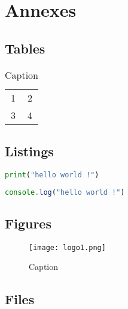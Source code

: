\section{Annexes}
\label{sec:annexes}

\subsection{Tables}
\begin{table}[hbt]
    \centering
    \begin{tabular}{c|c}
      1   &  2 \\
      3   &  4
    \end{tabular}
    \caption{Caption}
    \label{tab:my_label}
\end{table}





\newpage
\subsection{Listings}
\begin{lstlisting}[language=Python, caption=Example Python , label=lst:example1]
    print("hello world !")
\end{lstlisting}
\begin{lstlisting}[language=JavaScript, caption=Example JavaScript , label=lst:example2]
    console.log("hello world !")
\end{lstlisting}







\newpage
\subsection{Figures}
\begin{figure}[H]
    \centering
    \texttt{[image: logo1.png]}
    \caption{Caption}
    \label{fig:label}
\end{figure}







\newpage
\subsection{Files}
% 

